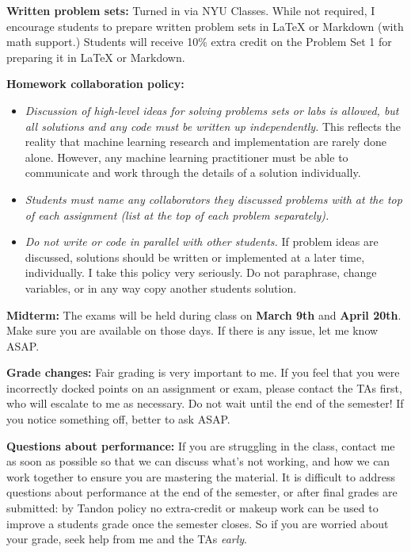 \documentclass[10pt]{article}
\begin{document}
\medskip\noindent\textbf{Written problem sets:} Turned in via NYU Classes. While not required, I encourage students to prepare written problem sets in LaTeX or Markdown (with math support.) Students will receive 10\% extra credit on the Problem Set 1 for preparing it in LaTeX or Markdown. 

\medskip\noindent\textbf{Homework collaboration policy:}
\begin{itemize}
 \item \textit{Discussion of high-level ideas for solving problems sets or labs is allowed, but all solutions and any code must be written up independently.} This reflects the reality that machine learning research and implementation are rarely done alone. However, any machine learning practitioner must be able to communicate and work through the details of a solution individually.
 \item \textit{Students must name any collaborators they discussed problems with at the top of each assignment (list at the top of each problem separately).} 
 \item \textit{Do not write or code in parallel with other students.} If problem ideas are discussed, solutions should be written or implemented at a later time, individually. I take this policy very seriously. Do not paraphrase, change variables, or in any way copy another students solution.
 \end{itemize}


	
\medskip\noindent\textbf{Midterm:} The exams will be held during class on \textbf{March 9th} and \textbf{April 20th}. Make sure you are available on those days. If there is any issue, let me know ASAP. 

\medskip\noindent\textbf{Grade changes:} Fair grading is very important to me. If you feel that you were incorrectly docked points on an assignment or exam, please contact the TAs first, who will escalate to me as necessary. Do not wait until the end of the semester! If you notice something off, better to ask ASAP.

\medskip\noindent\textbf{Questions about performance:} If you are struggling in the class, contact me as soon as possible so that we can discuss what's not working, and how we can work together to ensure you are mastering the material. It is difficult to address questions about performance at the end of the semester, or after final grades are submitted: by Tandon policy no extra-credit or makeup work can be used to improve a students grade once the semester closes. So if you are worried about your grade, seek help from me and the TAs \emph{early}. 
\end{document}
